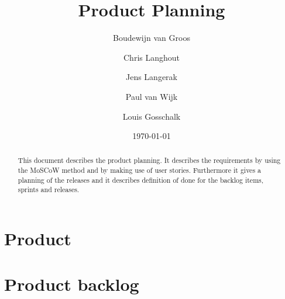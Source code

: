 \documentclass[a4paper]{article}
\title{Product Planning}
\author[1]{Boudewijn van Groos}
\author[2]{Chris Langhout}
\author[3]{Jens Langerak}
\author[4]{Paul van Wijk}
\author[5]{Louis Gosschalk}
\affil[1]{bvangroos \\
	4229843}
\affil[2]{clanghout \\
	4281705}
\affil[3]{jlangerak \\
	4317327}
\affil[4]{pjvanwijk \\
	4285034}
\affil[5]{lgosschalk \\
	4214528}
\affil[ ]{Health Informatics Group C}
\date{\today}
\begin{document}
\maketitle
\begin{abstract}
	This document describes the product planning. It describes the requirements by using the MoSCoW method and by making use of user stories. Furthermore it gives a planning of the releases and it describes definition of done for the backlog items, sprints and releases.
\end{abstract}
\newpage
\tableofcontents
\newpage


\section{Product}


\section{Product backlog}






\end{document}
